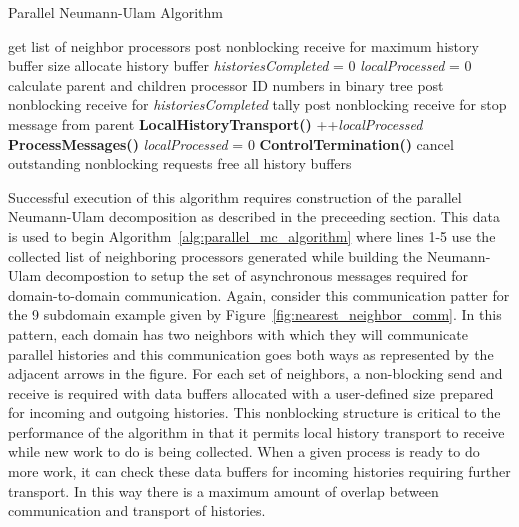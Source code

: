 \begin{algorithm}[h!]
  \caption{Parallel Neumann-Ulam Algorithm}
  \label{alg:parallel_mc_algorithm}
  \begin{algorithmic}[1]
    \State get list of neighbor processors 
    \State post nonblocking receive for maximum history buffer size
    \State allocate history buffer
    \EndFor
    \State \textit{historiesCompleted} = 0
    \State \textit{localProcessed} = 0
    \State calculate parent and children processor ID numbers in
    binary tree
    \State post nonblocking receive for \textit{historiesCompleted} tally
    \EndFor
    \State post nonblocking receive for stop message from parent
    \State \textbf{LocalHistoryTransport()}
    \State ++\textit{localProcessed}
    \EndIf
    \State \textbf{ProcessMessages()}
    \State \textit{localProcessed} = 0
    \EndIf
    \State \textbf{ControlTermination()}
    \EndIf
    \EndWhile
    \State cancel outstanding nonblocking requests
    \State free all history buffers
  \end{algorithmic}
\end{algorithm}

Successful execution of this algorithm requires construction of the
parallel Neumann-Ulam decomposition as described in the preceeding
section. This data is used to begin
Algorithm~\ref{alg:parallel_mc_algorithm} where lines 1-5 use the
collected list of neighboring processors generated while building the
Neumann-Ulam decompostion to setup the set of asynchronous messages
required for domain-to-domain communication. Again, consider this
communication patter for the 9 subdomain example given by
Figure~\ref{fig:nearest_neighbor_comm}. In this pattern, each domain
has two neighbors with which they will communicate parallel histories
and this communication goes both ways as represented by the adjacent
arrows in the figure. For each set of neighbors, a non-blocking send
and receive is required with data buffers allocated with a
user-defined size prepared for incoming and outgoing histories. This
nonblocking structure is critical to the performance of the algorithm
in that it permits local history transport to receive while new work
to do is being collected. When a given process is ready to do more
work, it can check these data buffers for incoming histories requiring
further transport. In this way there is a maximum amount of overlap
between communication and transport of histories.

